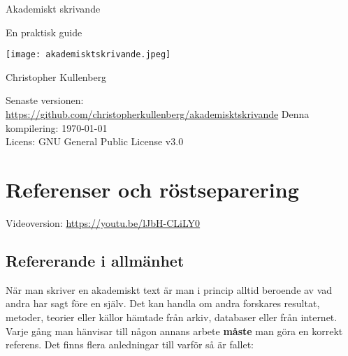 \documentclass[11pt,a4paper,footinclude=true,headinclude=true]{report} %
\begin{document}
\thispagestyle{empty}
\begin{center}
\begin{LARGE}
Akademiskt skrivande
\end{LARGE}

\bigskip
En praktisk guide

\bigskip
\bigskip
\bigskip
\bigskip
\bigskip
\bigskip


\texttt{[image: akademisktskrivande.jpeg]}
\bigskip
\\


\end{center}

\bigskip
\bigskip
\bigskip

\begin{scriptsize}
\noindent Christopher Kullenberg

\noindent Senaste versionen: \href{https://github.com/christopherkullenberg/akademisktskrivande}{https://github.com/christopherkullenberg/akademisktskrivande}
\noindent Denna kompilering: \today
\\
\noindent Licens: GNU General Public License v3.0 
\end{scriptsize}

\newpage %
\AtBeginShipoutNext{\AtBeginShipoutDiscard}%

	\tableofcontents
	\thispagestyle{empty}

\newpage %
\AtBeginShipoutNext{\AtBeginShipoutDiscard}%
%




\chapter{Referenser och röstseparering}

Videoversion: \href{https://youtu.be/lJbH-CLiLY0}{https://youtu.be/lJbH-CLiLY0}

\section{Refererande i allmänhet}

När man skriver en akademiskt text är man i princip alltid beroende av vad andra har sagt före en själv. Det kan handla om andra forskares resultat, metoder, teorier eller källor hämtade från arkiv, databaser eller från internet. Varje gång man hänvisar till någon annans arbete \textbf{måste} man göra en korrekt referens. Det finns flera anledningar till varför så är fallet:
\end{document}
